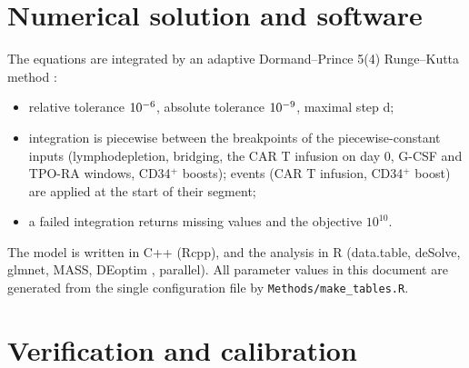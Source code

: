 \documentclass[11pt]{article}
\begin{document}
\section{Numerical solution and software}
The equations are integrated by an adaptive Dormand--Prince 5(4) Runge--Kutta method \citep{dormand1980}:
\begin{itemize}
\item relative tolerance $10^{-6}$, absolute tolerance $10^{-9}$, maximal step \valHmax{} d;
\item integration is piecewise between the breakpoints of the piecewise-constant inputs (lymphodepletion, bridging, the CAR T infusion on day 0, G-CSF and TPO-RA windows, CD34$^+$ boosts); events (CAR T infusion, CD34$^+$ boost) are applied at the start of their segment;
\item a failed integration returns missing values and the objective $10^{10}$.
\end{itemize}
The model is written in C++ (Rcpp), and the analysis in R \valRVersion{} (data.table, deSolve, glmnet, MASS, DEoptim \valDEoptim, parallel). All parameter values in this document are generated from the single configuration file by \texttt{Methods/make\_tables.R}.

\section{Verification and calibration}\label{sec:calibration}
\end{document}

